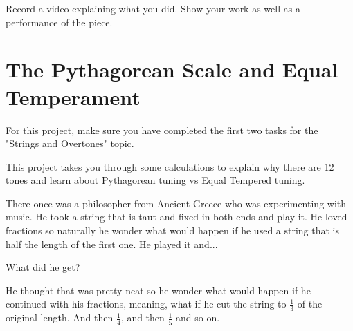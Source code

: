 \documentclass[12pt,noauthor,nooutcomes,hints,instructornotes]{ximera}%
\begin{document}
Record a video explaining what you did. Show your work as well as a performance of the piece.




\newpage
\section{The Pythagorean Scale and Equal Temperament}

For this project, make sure you have completed the first two tasks for the "Strings and Overtones" topic.

This project takes you through some calculations to explain why there are 12 tones and learn about Pythagorean tuning vs Equal Tempered tuning.


There once was a philosopher from Ancient Greece who was experimenting with music. He took a string that is taut and fixed in both ends and play it. He loved fractions so naturally he wonder what would happen if he used a string that is half the length of the first one. He played it and...

\begin{question}
 What did he get?
 \end{question}

He thought that was pretty neat so he wonder what would happen if he continued with his fractions, meaning, what if he cut the string to $\frac{1}{3}$ of the original length. And then $\frac{1}{4}$, and then $\frac{1}{5}$ and so on.
\end{document}
